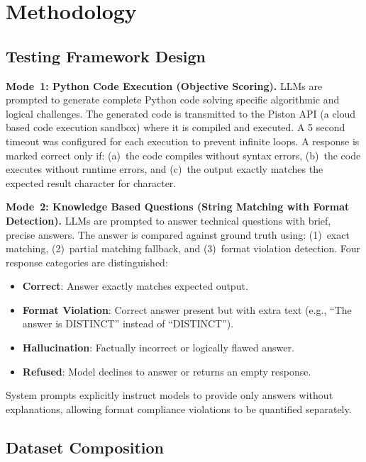 \documentclass[12pt,a4paper]{article}
\begin{document}
\section{Methodology}

\subsection{Testing Framework Design}

\textbf{Mode~1: Python Code Execution (Objective Scoring).}
LLMs are prompted to generate complete Python code solving specific algorithmic and logical challenges. The generated code is transmitted to the Piston API (a cloud based code execution sandbox) where it is compiled and executed. A 5 second timeout was configured for each execution to prevent infinite loops. A response is marked correct only if: (a)~the code compiles without syntax errors, (b)~the code executes without runtime errors, and (c)~the output exactly matches the expected result character for character.

\textbf{Mode~2: Knowledge Based Questions (String Matching with Format Detection).}
LLMs are prompted to answer technical questions with brief, precise answers. The answer is compared against ground truth using: (1)~exact matching, (2)~partial matching fallback, and (3)~format violation detection. Four response categories are distinguished:
\begin{itemize}[leftmargin=*]
  \item \textbf{Correct}: Answer exactly matches expected output.
  \item \textbf{Format Violation}: Correct answer present but with extra text (e.g., ``The answer is DISTINCT'' instead of ``DISTINCT'').
  \item \textbf{Hallucination}: Factually incorrect or logically flawed answer.
  \item \textbf{Refused}: Model declines to answer or returns an empty response.
\end{itemize}

System prompts explicitly instruct models to provide only answers without explanations, allowing format compliance violations to be quantified separately.

\subsection{Dataset Composition}
\end{document}
